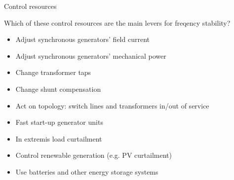 \begin{frame}{Control resources}

    Which of these control resources are the main levers for freqency stability?
      \begin{itemize}
          \item Adjust synchronous generators' field current
          \item Adjust synchronous generators' mechanical power
          \item Change transformer taps
          \item Change shunt compensation
          \item Act on topology: switch lines and transformers in/out of service
          \item Fast start-up generator units
          \item In extremis load curtailment
          \item Control renewable generation (e.g. PV curtailment)
          \item Use batteries and other energy storage systems %
      \end{itemize}
\end{frame}